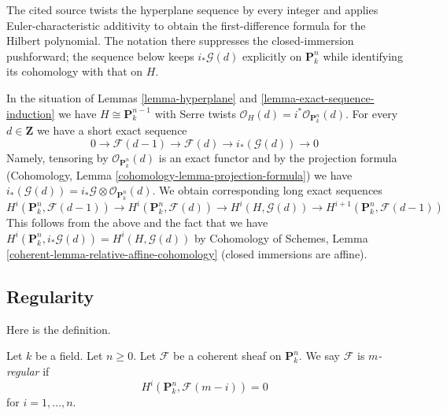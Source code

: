 \begin{remark}
\label{remark-exact-sequence-induction-cohomology}
\begin{reference}
\cite[Chapter III, \S 6, no. 81, proof of Proposition 6, p. 277]{FAC}
\end{reference}
\begin{history}
The cited source twists the hyperplane sequence by every integer and applies
Euler-characteristic additivity to obtain the first-difference formula for
the Hilbert polynomial. The notation there suppresses the closed-immersion
pushforward; the sequence below keeps $i_*\mathcal{G}(d)$ explicitly on
$\mathbf{P}^n_k$ while identifying its cohomology with that on $H$.
\end{history}
In the situation of Lemmas \ref{lemma-hyperplane} and
\ref{lemma-exact-sequence-induction}
we have $H \cong \mathbf{P}^{n - 1}_k$ with Serre twists
$\mathcal{O}_H(d) = i^*\mathcal{O}_{\mathbf{P}^n_k}(d)$.
For every $d \in \mathbf{Z}$ we have a short exact sequence
$$
0 \to \mathcal{F}(d - 1) \to \mathcal{F}(d) \to i_*(\mathcal{G}(d)) \to 0
$$
Namely, tensoring by $\mathcal{O}_{\mathbf{P}^n_k}(d)$ is an
exact functor and by the projection formula
(Cohomology, Lemma \ref{cohomology-lemma-projection-formula})
we have
$i_*(\mathcal{G}(d)) = i_*\mathcal{G} \otimes \mathcal{O}_{\mathbf{P}^n_k}(d)$.
We obtain corresponding long exact sequences
$$
H^i(\mathbf{P}^n_k, \mathcal{F}(d - 1)) \to
H^i(\mathbf{P}^n_k, \mathcal{F}(d)) \to
H^i(H, \mathcal{G}(d)) \to
H^{i + 1}(\mathbf{P}^n_k, \mathcal{F}(d - 1))
$$
This follows from the above and the fact that we have
$H^i(\mathbf{P}^n_k, i_*\mathcal{G}(d)) = H^i(H, \mathcal{G}(d))$ by
Cohomology of Schemes, Lemma \ref{coherent-lemma-relative-affine-cohomology}
(closed immersions are affine).
\end{remark}





\subsection{Regularity}
\label{subsection-regularity}

\noindent
Here is the definition.

\begin{definition}
\label{definition-regularity}
Let $k$ be a field. Let $n \geq 0$. Let $\mathcal{F}$ be a coherent
sheaf on $\mathbf{P}^n_k$. We say $\mathcal{F}$ is {\it $m$-regular}
if
$$
H^i(\mathbf{P}^n_k, \mathcal{F}(m - i)) = 0
$$
for $i = 1, \ldots, n$.
\end{definition}

